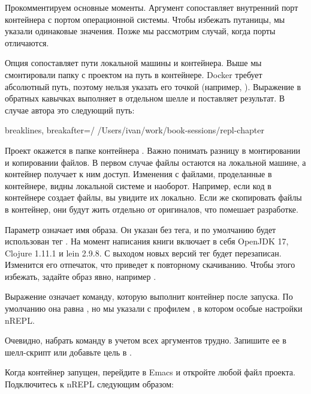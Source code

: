 Прокомментируем основные моменты. Аргумент   сопоставляет внутренний порт контейнера с портом операционной системы. Чтобы избежать путаницы, мы указали одинаковые значения. Позже мы рассмотрим случай, когда порты отличаются.

Опция   сопоставляет пути локальной машины и контейнера. Выше мы смонтировали папку с проектом на путь  в контейнере. Docker требует абсолютный путь, поэтому нельзя указать его точкой (например, ). Выражение  в обратных кавычках выполняет  в отдельном шелле и поставляет результат. В случае автора это следующий путь:

\begin{english}
  \begin{text*}{breaklines, breakafter=/}
/Users/ivan/work/book-sessions/repl-chapter
  \end{text*}
\end{english}

Проект окажется в папке контейнера . Важно понимать разницу в монтировании и копировании файлов. В первом случае файлы остаются на локальной машине, а контейнер получает к ним доступ. Изменения с файлами, проделанные в контейнере, видны локальной системе и наоборот. Например, если код в контейнере создает файлы, вы увидите их локально. Если же скопировать файлы в контейнер, они будут жить отдельно от оригиналов, что помешает разработке.

Параметр   означает имя образа. Он указан без тега, и по умолчанию будет использован тег . На момент написания книги  включает в себя OpenJDK 17, Clojure 1.11.1 и lein 2.9.8. С выходом новых версий тег  будет перезаписан. Изменится его отпечаток, что приведет к повторному скачиванию. Чтобы этого избежать, задайте образ явно, например .

Выражение   означает команду, которую выполнит контейнер после запуска. По умолчанию она равна , но мы указали  с профилем , в котором особые настройки nREPL.

Очевидно, набрать команду  в учетом всех аргументов трудно. Запишите ее в шелл-скрипт или добавьте цель в .

Когда контейнер запущен, перейдите в Emacs и откройте любой файл проекта. Подключитесь к nREPL следующим образом:


